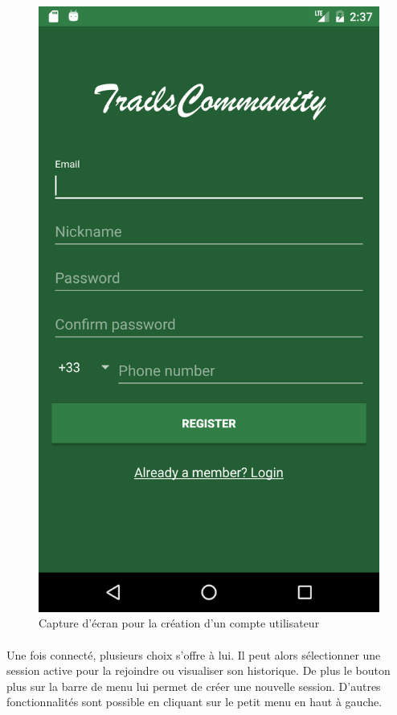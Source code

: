 \documentclass[titlepage, 12pt]{report}
\begin{document}
\begin{figure}[!h]
	\caption{Capture d'écran pour la création d'un compte utilisateur}
	\label{screenshots_register}
	\centering
	\includegraphics[scale=0.2]{Images/screenshots/register.png}
\end{figure}

\clearpage

\paragraph{}Une fois connecté, plusieurs choix s'offre à lui. Il peut alors sélectionner une session active pour la rejoindre ou visualiser son historique. De plus le bouton plus sur la barre de menu lui permet de créer une nouvelle session. D'autres fonctionnalités sont possible en cliquant sur le petit menu en haut à gauche.
\end{document}
